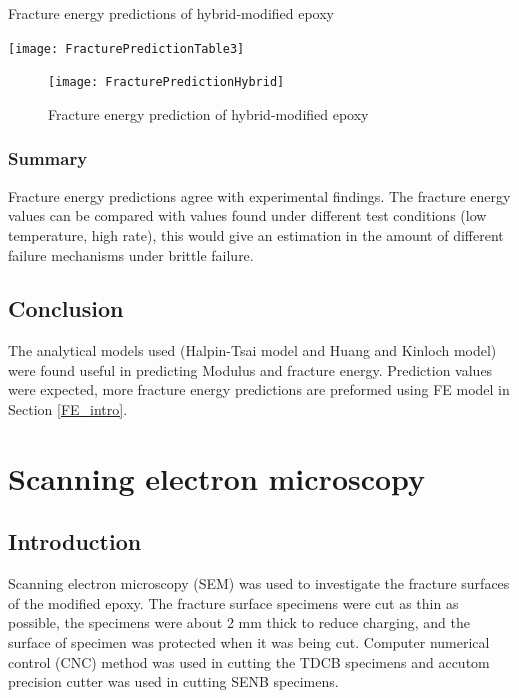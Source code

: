 \documentclass[numbers=noendperiod,chapterprefix=on]{icldt} %
\begin{document}
\begin{table}[!hp]
\centering
\caption{Fracture energy predictions of hybrid-modified epoxy} \label{fracturePredictionTable3}
\texttt{[image: FracturePredictionTable3]}
\end{table}
\FloatBarrier

\begin{figure}[!hp]
\centering
\texttt{[image: FracturePredictionHybrid]}
\caption{Fracture energy prediction of hybrid-modified epoxy} \label{fracturePredictionTable3}
\end{figure}
\FloatBarrier

\subsection{Summary}
Fracture energy predictions agree with experimental findings. The fracture energy values can be compared with values found under different test conditions (low temperature, high rate), this would give an estimation in the amount of different failure mechanisms under brittle failure.

\section{Conclusion}
The analytical models used (Halpin-Tsai model and Huang and Kinloch model) were found useful in predicting Modulus and fracture energy. Prediction values were expected, more fracture energy predictions are preformed using FE model in Section \ref{FE_intro}.

\chapter{Scanning electron microscopy} \label{SEM}
\section{Introduction}

Scanning electron microscopy (SEM) was used to investigate the fracture surfaces of the modified epoxy. 
The fracture surface specimens were cut as thin as possible, the specimens were about 2 mm thick to reduce charging, and the surface of specimen was protected when it was being cut. Computer numerical control (CNC) method was used in cutting the TDCB specimens and accutom precision cutter was used in cutting SENB specimens. 
\end{document}
